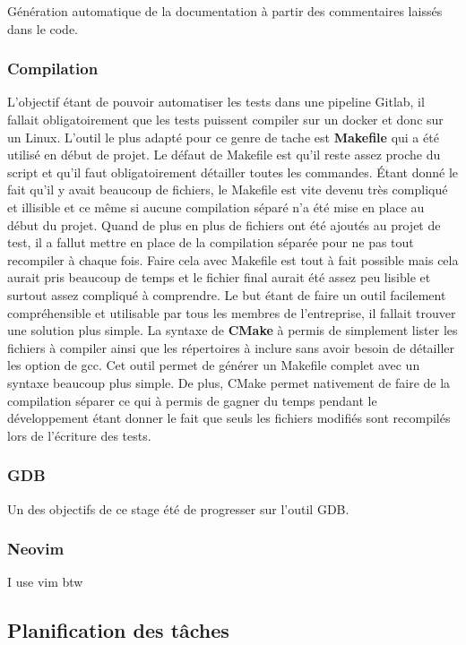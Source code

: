 \documentclass[a4paper]{article}
\begin{document}
Génération automatique de la documentation à partir des commentaires laissés
dans le code.

\subsubsection{Compilation}

L'objectif étant de pouvoir automatiser les tests dans une pipeline Gitlab, il
fallait obligatoirement que les tests puissent compiler sur un docker et donc
sur un Linux. L'outil le plus adapté pour ce genre de tache est
\textbf{Makefile} qui a été utilisé en début de projet. Le défaut de Makefile
est qu'il reste assez proche du script et qu'il faut obligatoirement détailler
toutes les commandes. Étant donné le fait qu'il y avait beaucoup de fichiers, le
Makefile est vite devenu très compliqué et illisible et ce même si aucune
compilation séparé n'a été mise en place au début du projet. Quand de plus en
plus de fichiers ont été ajoutés au projet de test, il a fallut mettre en place
de la compilation séparée pour ne pas tout recompiler à chaque fois. Faire cela
avec Makefile est tout à fait possible mais cela aurait pris beaucoup de temps     %
et le fichier final aurait été assez peu lisible et surtout assez compliqué à
comprendre. Le but étant de faire un outil facilement compréhensible et
utilisable par tous les membres de l'entreprise, il fallait trouver une solution
plus simple. La syntaxe de \textbf{CMake} à permis de simplement lister les
fichiers à compiler ainsi que les répertoires à inclure sans avoir besoin de
détailler les option de gcc. Cet outil permet de générer un Makefile complet
avec un syntaxe beaucoup plus simple. De plus, CMake permet nativement de faire
de la compilation séparer ce qui à permis de gagner du temps pendant le
développement étant donner le fait que seuls les fichiers modifiés sont
recompilés lors de l'écriture des tests.

\subsubsection{GDB}

Un des objectifs de ce stage été de progresser sur l'outil GDB.

\subsubsection{Neovim}

I use vim btw

\subsection{Planification des tâches}
\end{document}
